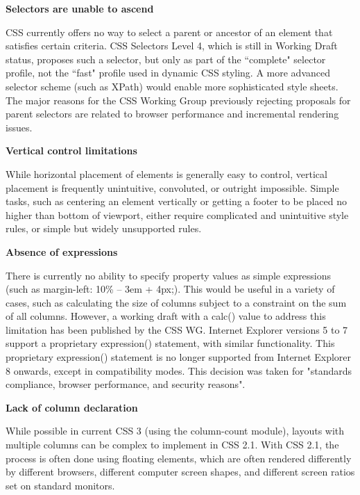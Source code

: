 \begin{compactitem}
\item \textbf{Selectors are unable to ascend}

CSS currently offers no way to select a parent or ancestor of an element that satisfies certain criteria. CSS Selectors Level 4, which is still in Working Draft status, proposes such a selector, but only as part of the ``complete" selector profile, not the ``fast" profile used in dynamic CSS styling. A more advanced selector scheme (such as XPath) would enable more sophisticated style sheets. The major reasons for the CSS Working Group previously rejecting proposals for parent selectors are related to browser performance and incremental rendering issues.

\item \textbf{Vertical control limitations}

While horizontal placement of elements is generally easy to control, vertical placement is frequently unintuitive, convoluted, or outright impossible. Simple tasks, such as centering an element vertically or getting a footer to be placed no higher than bottom of viewport, either require complicated and unintuitive style rules, or simple but widely unsupported rules.

\item \textbf{Absence of expressions}

There is currently no ability to specify property values as simple expressions (such as margin-left: 10\% – 3em + 4px;). This would be useful in a variety of cases, such as calculating the size of columns subject to a constraint on the sum of all columns. However, a working draft with a calc() value to address this limitation has been published by the CSS WG. Internet Explorer versions 5 to 7 support a proprietary expression() statement, with similar functionality. This proprietary expression() statement is no longer supported from Internet Explorer 8 onwards, except in compatibility modes. This decision was taken for "standards compliance, browser performance, and security reasons".

\item \textbf{Lack of column declaration}

While possible in current CSS 3 (using the column-count module), layouts with multiple columns can be complex to implement in CSS 2.1. With CSS 2.1, the process is often done using floating elements, which are often rendered differently by different browsers, different computer screen shapes, and different screen ratios set on standard monitors.


\end{compactitem}

